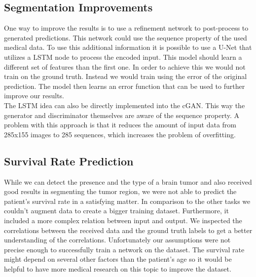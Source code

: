 \documentclass[a4paper,12pt,pagesize,headsepline,bibtotoc,titlepage]{scrartcl}
\begin{document}
\subsection{Segmentation Improvements}

One way to improve the results is to use a refinement network to post-process to generated predictions.
This network could use the sequence property of the used medical data.
To use this additional information it is possible to use a U-Net that utilizes a LSTM node to process the encoded input.
This model should learn a different set of features than the first one.
In order to achieve this we would not train on the ground truth.
Instead we would train using the error of the original prediction.
The model then learns an error function that can be used to further improve our results.\\
The LSTM idea can also be directly implemented into the cGAN.
This way the generator and discriminator themselves are aware of the sequence property.
A problem with this approach is that it reduces the amount of input data from 285x155 images to 285 sequences, which increases the problem of overfitting.

\subsection{Survival Rate Prediction}
While we can detect the presence and the type of a brain tumor and also received good results in segmenting the tumor region, we were not able to predict the patient's survival rate in a satisfying matter.
In comparison to the other tasks we couldn't augment data to create a bigger training dataset.
Furthermore, it included a more complex relation between input and output.
We inspected the correlations between the received data and the ground truth labels to get a better understanding of the correlations.
Unfortunately our assumptions were not precise enough to successfully train a network on the dataset.
The survival rate might depend on several other factors than the patient's age so it would be helpful to have more medical research on this topic to improve the dataset. \\


\newpage
%


\end{document}
